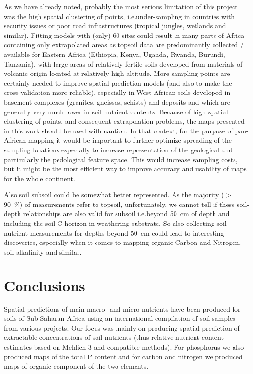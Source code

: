\begin{linenumbers}
As we have already noted, probably the most serious limitation of this project was the high spatial clustering of points, i.e.\@ under-sampling in countries with security issues or poor road infrastructures (tropical jungles, wetlands and similar). Fitting models with (only) 60 sites could result in many parts of Africa containing only extrapolated areas as topsoil data are predominantly collected / available for Eastern Africa (Ethiopia, Kenya, Uganda, Rwanda, Burundi, Tanzania), with large areas of relatively fertile soils developed from materials of volcanic origin located at relatively high altitude. More sampling points are certainly needed to improve spatial prediction models (and also to make the cross-validation more reliable), especially in West African soils developed in basement complexes (granites, gneisses, schists) and deposits and which are generally very much lower in soil nutrient contents. Because of high spatial clustering of points, and consequent extrapolation problems, the maps presented in this work should be used with caution. In that context, for the purpose of pan-African mapping it would be important to further optimize spreading of the sampling locations especially to increase representation of the geological and particularly the pedological feature space. This would increase sampling costs, but it might be the most efficient way to improve accuracy and usability of maps for the whole continent. \par

Also soil subsoil could be somewhat better represented. As the majority ($>$\SI{90}{\percent}) of measurements refer to topsoil, unfortunately, we cannot tell if these soil-depth relationships are also valid for subsoil i.e.\@ beyond \SI{50}{\centi\metre} of depth and including the soil C horizon in weathering substrate. So also collecting soil nutrient measurements for depths beyond \SI{50}{\centi\metre} could lead to interesting discoveries, especially when it comes to mapping organic Carbon and Nitrogen, soil alkalinity and similar.\par

\section{Conclusions}

Spatial predictions of main macro- and micro-nutrients have been produced for soils of Sub-Saharan Africa using an international compilation of soil samples from various projects. Our focus was mainly on producing spatial prediction of extractable concentrations of soil nutrients (thus relative nutrient content estimates based on Mehlich-3 and compatible methods). For phosphorus we also produced maps of the total P content and for carbon and nitrogen we produced maps of organic component of the two elements.\par


\end{linenumbers}
